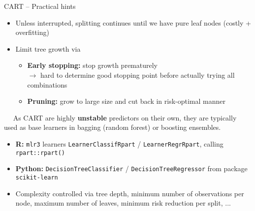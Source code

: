 \begin{frame}{CART -- Practical hints}

\footnotesize


\begin{itemize}
  \item Unless interrupted, splitting continues until we have pure
  leaf nodes (costly + overfitting)
  \item Limit tree growth via
  \begin{itemize}
    \item \textbf{Early stopping:} stop growth prematurely \\ $\rightarrow$ hard 
    to determine good stopping point before actually trying all combinations
    \item \textbf{Pruning:} grow to large size and cut back in risk-optimal 
    manner
  \end{itemize}
\end{itemize}

\medskip

 ~~ 
As CART are highly \textbf{unstable} predictors on their own, they are typically 
used as base learners in bagging (random forest) or boosting ensembles.

\medskip

\begin{itemize}
  \item \textbf{R:} \texttt{mlr3} learners \texttt{LearnerClassifRpart} / 
    \texttt{LearnerRegrRpart}, calling \texttt{rpart::rpart()}
  \item \textbf{Python:} \texttt{DecisionTreeClassifier} / 
  \texttt{DecisionTreeRegressor} from package \texttt{scikit-learn}
  \item Complexity controlled via tree depth, minimum number of observations 
  per node, maximum number of leaves, minimum risk reduction per split, ...
\end{itemize}

\end{frame}
